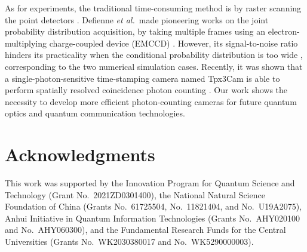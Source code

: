 \documentclass[pra,english,reprint,nofootinbib,aps,superscriptaddress,showpacs,showkeys]{revtex4-2}
\theoremstyle{definition}
\theoremstyle{remark}
\begin{document}
	As for experiments, the traditional time-consuming method is by raster scanning the point detectors \cite{ghostimag,Howell2004}. Defienne \emph{et al.}\ made pioneering works on the joint probability distribution acquisition, by taking multiple frames using an electron-multiplying charge-coupled device (EMCCD) \cite{Defienne2018,Reichert2018,Reichert2018PRA,Defienne20182,polarent}. However, its signal-to-noise ratio hinders its practicality when the conditional probability distribution is too wide \cite{OAMEMCCD}, corresponding to the two numerical simulation cases. Recently, it was shown that a single-photon-sensitive time-stamping camera named Tpx3Cam is able to perform spatially resolved coincidence photon counting \cite{arxiv2023}. Our work shows the necessity to develop more efficient photon-counting cameras for future quantum optics and quantum communication technologies.
	
	\section*{Acknowledgments}
	
	This work was supported by the Innovation Program for Quantum Science and Technology (Grant No.\ 2021ZD0301400), the National Natural Science Foundation of China (Grants No.\ 61725504, No.\ 11821404, and No.\ U19A2075), Anhui Initiative in Quantum Information Technologies (Grants No.\ AHY020100 and No.\ AHY060300), and the Fundamental Research Funds for the Central Universities (Grants No.\ WK2030380017 and No.\ WK5290000003).
	
\end{document}
